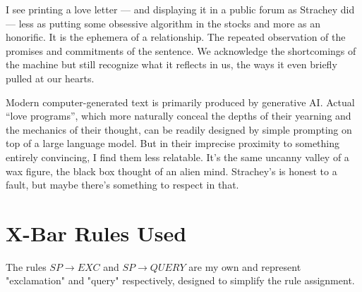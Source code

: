 \documentclass[runningheads]{llncs}
\begin{document}
I see printing a love letter — and displaying it in a public forum as Strachey did — less as putting some obsessive algorithm in the stocks and more as an honorific. It is the ephemera of a relationship. The repeated observation of the promises and commitments of the sentence. We acknowledge the shortcomings of the machine but still recognize what it reflects in us, the ways it even briefly pulled at our hearts.

Modern computer-generated text is primarily produced by generative AI. Actual “love programs”, which more naturally conceal the depths of their yearning and the mechanics of their thought, can be readily designed by simple prompting on top of a large language model. But in their imprecise proximity to something entirely convincing, I find them less relatable. It’s the same uncanny valley of a wax figure, the black box thought of an alien mind. Strachey’s is honest to a fault, but maybe there’s something to respect in that.



\newpage
\appendix
\section{X-Bar Rules Used} \label{app:xbar}
The rules $SP \rightarrow EXC$ and $SP \rightarrow QUERY$ are my own and represent "exclamation" and "query" respectively, designed to simplify the rule assignment.
\end{document}
